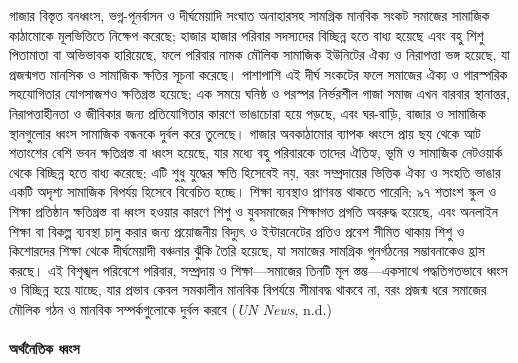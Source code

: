 গাজার বিস্তৃত বনধ্বংস, ভগ্ন-পূনর্বাসন ও দীর্ঘমেয়াদি সংঘাত অনাহারসহ সামগ্রিক
মানবিক সংকট সমাজের সামাজিক কাঠামোকে মূলভিত্তিতে নিক্ষেপ করেছে; হাজার হাজার
পরিবার সদস্যদের বিচ্ছিন্ন হতে বাধ্য হয়েছে এবং বহু শিশু পিতামাতা বা অভিভাবক
হারিয়েছে, ফলে পরিবার নামক মৌলিক সামাজিক ইউনিটের ঐক্য ও নিরাপত্তা ভঙ্গ
হয়েছে, যা প্রজন্মগত মানসিক ও সামাজিক ক্ষতির সূচনা করেছে। পাশাপাশি এই দীর্ঘ
সংকটের ফলে সমাজের ঐক্য ও পারস্পরিক সহযোগিতার যোগসাজশও ক্ষতিগ্রস্ত হয়েছে; এক
সময়ে ঘনিষ্ঠ ও পরস্পর নির্ভরশীল গাজা সমাজ এখন বারবার স্থানান্তর, নিরাপত্তাহীনতা
ও জীবিকার জন্য প্রতিযোগিতার কারণে ভাঙাচোরা হয়ে পড়ছে, এবং ঘর-বাড়ি, বাজার ও
সামাজিক স্থানগুলোর ধ্বংস সামাজিক বন্ধনকে দুর্বল করে তুলেছে। গাজার অবকাঠামোর
ব্যাপক ধ্বংসে প্রায় ছয় থেকে আট শতাংশের বেশি ভবন ক্ষতিগ্রস্ত বা ধ্বংস হয়েছে, যার
মধ্যে বহু পরিবারকে তাদের ঐতিহ্য, ভূমি ও সামাজিক নেটওয়ার্ক থেকে বিচ্ছিন্ন হতে
বাধ্য করেছে; এটি শুধু যুদ্ধের ক্ষতি হিসেবেই নয়, বরং সম্প্রদায়ের ভিত্তিক ঐক্য ও
সংহতি ভাঙার একটি অদৃশ্য সামাজিক বিপর্যয় হিসেবে বিবেচিত হচ্ছে। শিক্ষা ব্যবস্থাও
প্রাণবন্ত থাকতে পারেনি; ৯৭ শতাংশ স্কুল ও শিক্ষা প্রতিষ্ঠান ক্ষতিগ্রস্ত বা ধ্বংস
হওয়ার কারণে শিশু ও যুবসমাজের শিক্ষাগত প্রগতি অবরুদ্ধ হয়েছে, এবং অনলাইন শিক্ষা
বা বিকল্প ব্যবস্থা চালু করার জন্য প্রয়োজনীয় বিদ্যুৎ ও ইন্টারনেটের প্রতিও প্রবেশ
সীমিত থাকায় শিশু ও কিশোরদের শিক্ষা থেকে দীর্ঘমেয়াদী বঞ্চনার ঝুঁকি তৈরি হয়েছে,
যা সমাজের সামগ্রিক পুনর্গঠনের সম্ভাবনাকেও হ্রাস করছে। এই বিশৃঙ্খল পরিবেশে
পরিবার, সম্প্রদায় ও শিক্ষা---সমাজের তিনটি মূল স্তম্ভ---একসাথে পদ্ধতিগতভাবে ধ্বংস
ও বিচ্ছিন্ন হয়ে যাচ্ছে, যার প্রভাব কেবল সমকালীন মানবিক বিপর্যয়ে সীমাবদ্ধ থাকবে
না, বরং প্রজন্ম ধরে সমাজের মৌলিক গঠন ও মানবিক সম্পর্কগুলোকে দুর্বল করবে
(\emph{UN News}, n.d.)

\paragraph{\texorpdfstring{অর্থনৈতিক ধ্বংস}{অর্থনৈতিক ধ্বংস}}\label{ux985ux9b0ux9a5ux9a8ux9a4ux995-ux9a7ux9acux9b8}


